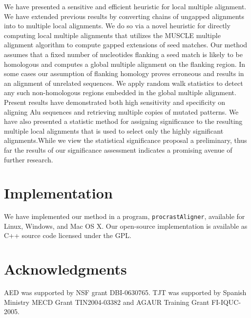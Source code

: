\documentclass{ws-procs9x6}
\begin{document}
We have presented a sensitive and efficient heuristic for local multiple alignment.
We have extended previous results by converting chains of ungapped alignments into to multiple local alignments. We do so via a novel heuristic for directly computing local multiple alignments that utilizes the MUSCLE multiple alignment algorithm to compute gapped extensions of seed matches.  Our method assumes that a fixed number of nucleotides flanking a seed match is likely to be homologous and computes a global multiple alignment on the flanking region.  In some cases our assumption of flanking homology proves erroneous and results in an alignment of unrelated sequences.  We apply random walk statistics to detect any such non-homologous regions embedded in the global multiple alignment.
Present results have demonstrated both high sensitivity and specificity on aligning Alu
sequences and retrieving multiple copies of mutated patterns. We have also presented a statistic method for assigning significance to the resulting multiple local alignments that is used to select only the highly significant alignments.While we view the statistical significance proposal a preliminary, thus far the results of our significance assessment indicates a promising avenue of further research.

\section{Implementation}
We have implemented our method in a program, \texttt{procrastAligner}, available for Linux, Windows, and Mac OS X. Our open-source implementation is available as C++ source code licensed under the GPL. 

\section{ Acknowledgments }
AED was supported by NSF grant DBI-0630765. TJT was
supported by Spanish Ministry MECD Grant TIN2004-03382 and AGAUR
Training Grant FI-IQUC-2005.




\end{document}
